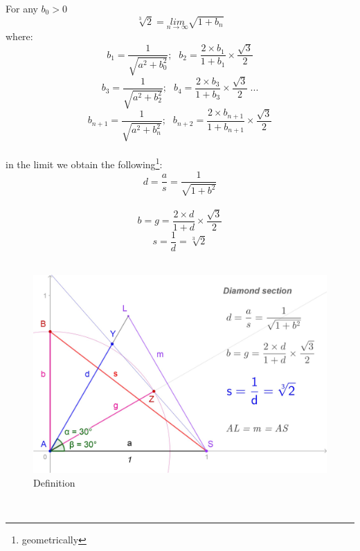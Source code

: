\documentclass[12pt, letterpaper, oneside]{report}
\begin{document}
For any $b_{0} > 0$
\begin{equation}
\sqrt[3]{2}= \underset{n\to \infty }{lim} \sqrt{1+b_{n}}
\end{equation}
where:   
\begin{equation}
b_{1}=\dfrac{1}{\sqrt{a^{2}+b_{0}^{2}}};\ \hspace{5pt} b_{2}=\frac{2\times b_{1}}{1+b_{1}}\times\frac{\sqrt{3}}{2}
\end{equation}
\begin{equation}
b_{3}=\dfrac{1}{\sqrt{a^{2}+b_{2}^{2}}};\ \hspace{5pt} b_{4}=\frac{2\times b_{3}}{1+b_{3}}\times\frac{\sqrt{3}}{2} \ ...
\end{equation}
\begin{equation}
b_{n+1}=\dfrac{1}{\sqrt{a^{2}+b_{n}^{2}}};\ \hspace{5pt} b_{n+2}=\frac{2\times b_{n+1}}{1+b_{n+1}}\times\frac{\sqrt{3}}{2}
\end{equation}
\\
in the limit we obtain the following\footnote{geometrically}:
\begin{equation}
d=\frac{a}{s}=\frac{1}{\sqrt{1+b^{2}}}
\end{equation}
\\
\begin{equation}
 b=g=\frac{2\times d}{1+d}\times\frac{\sqrt{3}}{2}
\end{equation}
\begin{equation}
s=\dfrac{1}{d}=\sqrt[3]{2}
\end{equation}
\\
\begin{figure}[h]
	\centering
	\includegraphics[width=0.7\linewidth]{images/ds_new_def.jpg}
	\caption{Definition}
	\label{fig:definition}
\end{figure} \\

\begin{center}

\end{center}
\newpage
 
\end{document}
